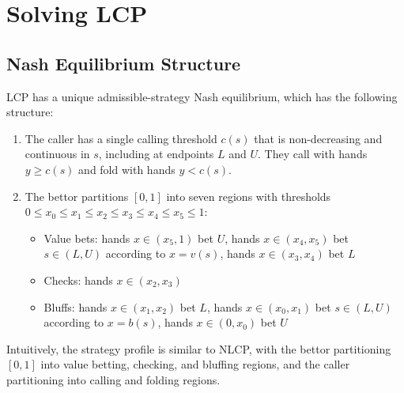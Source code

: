 \documentclass[../../main/main.tex]{subfiles}
\begin{document}
\section{Solving LCP}

\subsection{Nash Equilibrium Structure}

\begin{theorem}
    \label{thm:nash_equilibrium_structure}
    LCP has a unique admissible-strategy Nash equilibrium, which has the following structure:

    \begin{enumerate}
        \item The caller has a single calling threshold $c(s)$ that is non-decreasing and continuous in $s$, including at endpoints $L$ and $U$. They call with hands $y \geq c(s)$ and fold with hands $y < c(s)$.
        
        \item The bettor partitions $[0,1]$ into seven regions with thresholds $0 \leq x_0 \leq x_1 \leq x_2 \leq x_3 \leq x_4 \leq x_5 \leq 1$:
        \begin{itemize}
            \item Value bets: hands $x \in (x_5,1)$ bet $U$, hands $x \in (x_4,x_5)$ bet $s \in (L,U)$ according to $x=v(s)$, hands $x \in (x_3,x_4)$ bet $L$
            \item Checks: hands $x \in (x_2,x_3)$
            \item Bluffs: hands $x \in (x_1,x_2)$ bet $L$, hands $x \in (x_0,x_1)$ bet $s \in (L,U)$ according to $x=b(s)$, hands $x \in (0,x_0)$ bet $U$
        \end{itemize}
    \end{enumerate}
\end{theorem}

Intuitively, the strategy profile is similar to NLCP, with the bettor partitioning $[0,1]$ into value betting, checking, and bluffing regions, and the caller partitioning into calling and folding regions.
\end{document}
